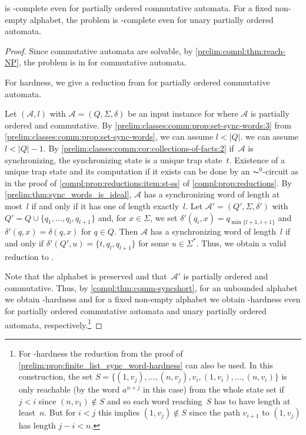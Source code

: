 \begin{theorem} \label{prelim:compl:reach-commm}
	\REACH is \NP-complete even for partially ordered commutative automata.
	For a fixed non-empty alphabet,
	the problem is \LOGSPACE-complete even for unary partially ordered automata.
\end{theorem}
\begin{proof}
	Since commutative automata are solvable, 
	by \cref{prelim:compl:thm:reach-NP}, the problem is in \NP for commutative automata.	
	
	For hardness, we give a reduction from \DFASWS
	for partially ordered commutative automata.
	
	Let $(\mathcal A, l)$ with $\mathcal A = (Q, \Sigma, \delta)$
	be an input instance for \DFASWS 
	where $\mathcal A$ is partially ordered and commutative.
	By \cref{prelim:classes:comm:prop:set-sync-words:3} from \cref{prelim:classes:comm:prop:set-sync-words},
	we can assume $l < |Q|$. we can assume $l < |Q| - 1$.
	By \cref{prelim:classes:comm:cor:collections-of-facts:2} if~$\mathcal A$ is synchronizing, 
	the synchronizing
	state is a unique trap state~$t$. Existence of a unique trap state
	and its computation if it exists can be done by an $\AC^0$-circuit
	as in the proof of \cref{compl:prop:reductions:item:st-ss} of \cref{compl:prop:reductions}.
	By \cref{prelim:thm:sync_words_is_ideal}, $\mathcal A$ has a synchronizing
	word of length at most~$l$ if and only if it has one of length exactly~$l$.
	Let $\mathcal A' = (Q', \Sigma, \delta')$
	with $Q' = Q \cup \{q_1, \ldots, q_l, q_{l+1}\}$
	and, for $x \in \Sigma$, we
	set $\delta'(q_i,x) = q_{\min\{l+1,i+1\}}$ 
	and $\delta'(q, x) = \delta(q, x)$ for $q \in Q$.
	Then $\mathcal A$ has a synchronizing word of length~$l$
	if and only if $\delta'(Q', u) = \{t, q_{l}, q_{l+1}\}$
	for some $u \in \Sigma^*$.
	Thus, we obtain a valid reduction to \REACH.
	
	Note that the alphabet is preserved
	and that~$\mathcal A'$ is partially ordered and commutative.
	Thus, by \cref{compl:thm:comm-syncshort},
	for an unbounded alphabet we obtain \NP-hardness
	and for a fixed non-empty alphabet we obtain \LOGSPACE-hardness
	even for partially ordered commutative automata
	and unary partially ordered automata, respectively.\footnote{For \LOGSPACE-hardness
		the reduction from the proof of	 \cref{prelim:prop:finite_list_sync_word-hardness}
		can also be used. In this construction, 
		the set $S = \{ (1, v_j), \ldots, (n, v_j), v_i, (1, v_i), \ldots, (n, v_i) \}$
		is only reachable (by the word $a^{n+j}$ in this case) from the whole state set if $j < i$
		since $(n, v_1) \notin S$
		and so each word reaching~$S$
		has to have length at least~$n$.
		But for $i < j$ this implies $(1, v_j) \notin S$
		since the path  $v_{i+1}$ to $(1, v_j)$
		has length $j - i < n$.}
		

\end{proof}
